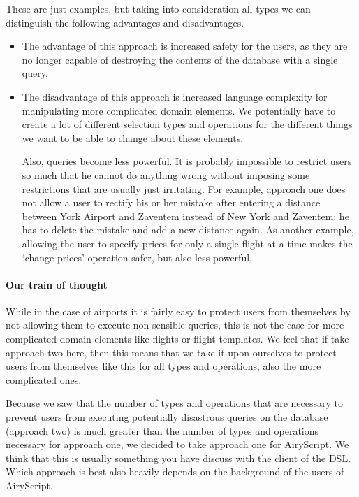 These are just examples, but taking into consideration all types we can
distinguish the following advantages and disadvantages.
\begin{itemize}
  \item The advantage of this approach is increased safety for the users, as
    they are no longer capable of destroying the contents of the database with a
    single query.
  \item The disadvantage of this approach is increased language complexity
    for manipulating more complicated domain elements. We potentially
    have to create a lot of different selection types and operations for the
    different things we want to be able to change about these elements.

    Also, queries become less powerful. It is probably impossible to restrict
    users so much that he cannot do anything wrong without imposing some
    restrictions that are usually just irritating. For example, approach one
    does not allow a user to rectify his or her mistake after entering a distance
    between York Airport and Zaventem instead of New York and Zaventem: he has
    to delete the mistake and add a new distance again. As another example,
    allowing the user to specify prices for only a single flight at a time makes
    the ‘change prices’ operation safer, but also less powerful.
\end{itemize}

\paragraph{Our train of thought}
While in the case of airports it is fairly easy to protect users from themselves
by not allowing them to execute non-sensible queries, this is not the case for
more complicated domain elements like flights or flight templates. We feel that
if take approach two here, then this means that we take it upon ourselves to
protect users from themselves like this for all types and operations, also the
more complicated ones.

Because we saw that the number of types and operations that are necessary to
prevent users from executing potentially disastrous queries on the database
(approach two) is much greater than the number of types and operations necessary
for approach one, we decided to take approach one for AiryScript. We think that
this is usually something you have discuss with the client of the DSL. Which
approach is best also heavily depends on the background of the users of
AiryScript.

